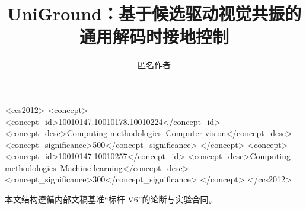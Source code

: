 \documentclass[sigconf]{acmart}
\begin{document}
\title{UniGround：基于候选驱动视觉共振的通用解码时接地控制}

\author{匿名作者}

\renewcommand{\shortauthors}{Anonymous et al.}

\begin{abstract}

\end{abstract}

\begin{CCSXML}
<ccs2012>
 <concept>
  <concept_id>10010147.10010178.10010224</concept_id>
  <concept_desc>Computing methodologies~Computer vision</concept_desc>
  <concept_significance>500</concept_significance>
 </concept>
 <concept>
  <concept_id>10010147.10010257</concept_id>
  <concept_desc>Computing methodologies~Machine learning</concept_desc>
  <concept_significance>300</concept_significance>
 </concept>
</ccs2012>
\end{CCSXML}



\maketitle



\begin{acks}
本文结构遵循内部文稿基准“标杆 V6”的论断与实验合同。
\end{acks}



\end{document}

